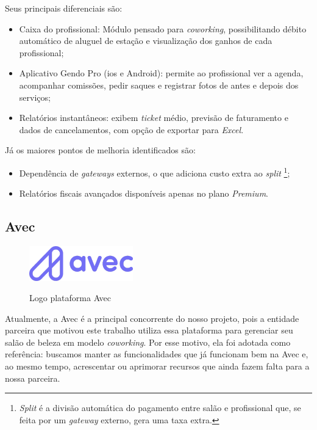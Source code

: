 Seus principais diferenciais são:
\begin{itemize}
	\item Caixa do profissional: Módulo pensado para \emph{coworking}, possibilitando débito automático de aluguel de estação e visualização dos ganhos de cada profissional;
	\item Aplicativo Gendo Pro (\gls{ios} e Android): permite ao profissional ver a agenda, acompanhar comissões, pedir saques e registrar fotos de antes e depois dos serviços;
	\item Relatórios instantâneos: exibem \emph{ticket} médio, previsão de faturamento e dados de cancelamentos, com opção de exportar para \emph{Excel}.
\end{itemize}


Já os maiores pontos de melhoria identificados são:
\begin{itemize}
	\item Dependência de \emph{gateways} externos, o que adiciona custo extra ao \emph{split} \footnote{\emph{Split} é a divisão automática do pagamento entre salão e profissional que, se feita por um \emph{gateway} externo, gera uma taxa extra.};
	\item Relatórios fiscais avançados disponíveis apenas no plano \emph{Premium}.
\end{itemize}

\subsection{Avec}

\begin{figure}[htb]
	\centering
	\caption{Logo plataforma Avec}
	\includegraphics[width=0.4\textwidth]{cap01-Introducao/Images/1.4.3_Avec}
	\label{fig:Avec}
\end{figure}

 \FloatBarrier

Atualmente, a Avec é a principal concorrente do nosso projeto, pois a entidade parceira que motivou este trabalho utiliza essa plataforma para gerenciar seu salão de beleza em modelo \emph{coworking}. Por esse motivo, ela foi adotada como referência: buscamos manter as funcionalidades que já funcionam bem na Avec e, ao mesmo tempo, acrescentar ou aprimorar recursos que ainda fazem falta para a nossa parceira.

